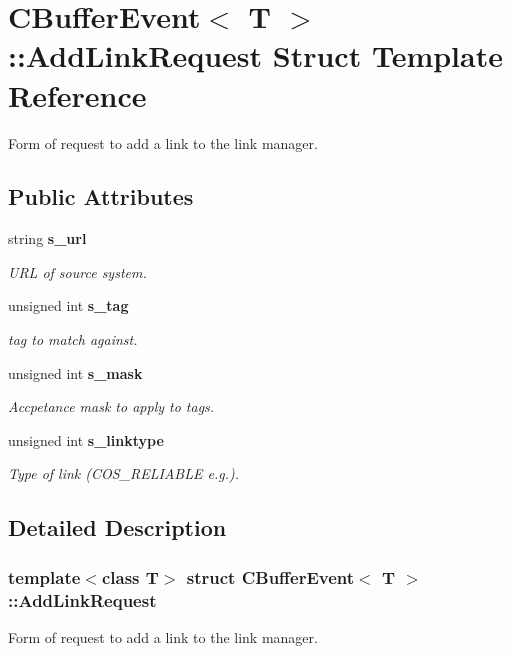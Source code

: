 \section{CBuffer\-Event$<$ T $>$::Add\-Link\-Request  Struct Template Reference}
\label{structCBufferEvent_1_1AddLinkRequest}
Form of request to add a link to the link manager. 


\subsection*{Public Attributes}
\begin{CompactItemize}
\item 
string {\bf s\_\-url}
\begin{CompactList}\small\item\em URL of source system.\item\end{CompactList}\item 
unsigned int {\bf s\_\-tag}
\begin{CompactList}\small\item\em tag to match against.\item\end{CompactList}\item 
unsigned int {\bf s\_\-mask}
\begin{CompactList}\small\item\em Accpetance mask to apply to tags.\item\end{CompactList}\item 
unsigned int {\bf s\_\-linktype}
\begin{CompactList}\small\item\em Type of link (COS\_\-RELIABLE e.g.).\item\end{CompactList}\end{CompactItemize}


\subsection{Detailed Description}
\subsubsection*{template$<$class T$>$ struct CBuffer\-Event$<$ T $>$::Add\-Link\-Request}

Form of request to add a link to the link manager.



